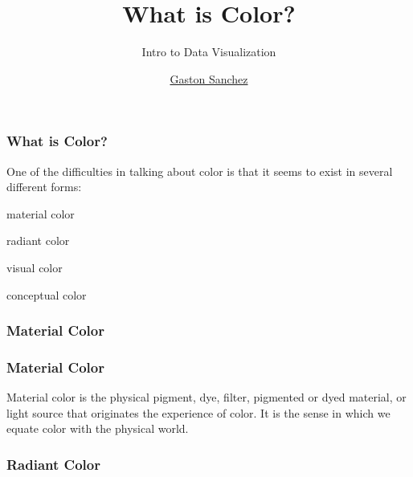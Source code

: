 \documentclass[12pt]{beamer}\usepackage[]{graphicx}\usepackage[]{color}
\title{What is Color?}
\subtitle{Intro to Data Visualization}
\author{\href{http://www.gastonsanchez.com}{Gaston Sanchez}}
\institute{\href{https://creativecommons.org/licenses/by-sa/4.0/}{\tt \scriptsize \color{foreground} CC BY-SA 4.0}}
\date{}
\begin{document}
{
  \frame{
    \titlepage
  } 
}


\begin{frame}
\begin{center}
\Huge{}
\end{center}
\end{frame}


\begin{frame}
\frametitle{What is Color?}

One of the difficulties in talking about color is that it seems to exist in
several different forms:
\bbi
  \item material color
  \item radiant color
  \item visual color
  \item conceptual color
 \ei
\eb

\end{frame}


\begin{frame}
\frametitle{Material Color}
\begin{center}
\end{center}
\end{frame}


\begin{frame}
\frametitle{Material Color}

Material color is the physical pigment, dye, filter, pigmented or dyed 
material, or light source that originates the experience of color. It is the
sense in which we equate color with the physical world.
\eb

{}

\end{frame}


\begin{frame}
\frametitle{Radiant Color}
\begin{center}
\end{center}
\end{frame}
\end{document}

